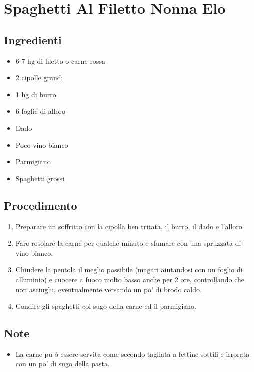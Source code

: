 \section{Spaghetti Al Filetto Nonna Elo}
\subsection{Ingredienti}
\begin{itemize}
\item 6-7 hg di filetto o carne rossa  
\item 2 cipolle grandi  
\item 1 hg di burro  
\item 6 foglie di alloro  
\item Dado  
\item Poco vino bianco  
\item Parmigiano  
\item Spaghetti grossi
\end{itemize}
\subsection{Procedimento}
\begin{enumerate}
\item  Preparare un soffritto con la cipolla ben tritata, il burro, il dado e l'alloro.  
\item  Fare rosolare la carne per qualche minuto e sfumare con una spruzzata di vino bianco.  
\item  Chiudere la pentola il meglio possibile (magari aiutandosi con un foglio di alluminio) e cuocere a fuoco molto basso anche per 2 ore, controllando che non asciughi, eventualmente versando un po' di brodo caldo.  
\item  Condire gli spaghetti col sugo della carne ed il parmigiano.
\end{enumerate}
\subsection{Note}
\begin{itemize}
\item La carne pu ò essere servita come secondo tagliata a fettine sottili e irrorata con un po' di sugo della pasta.
\end{itemize}
